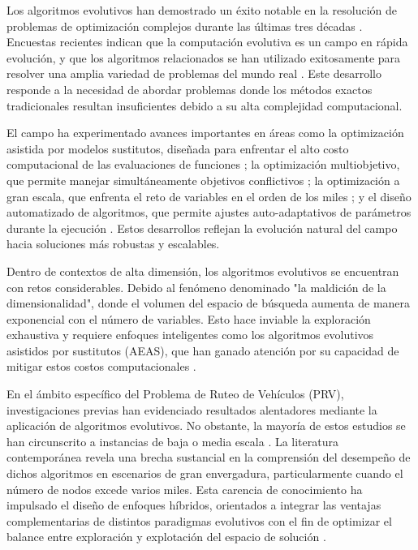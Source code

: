 \documentclass[conference]{IEEEtran}
\begin{document}
Los algoritmos evolutivos han demostrado un éxito notable en la resolución de problemas de optimización complejos durante las últimas tres décadas \cite{fogel2006,back2013}. Encuestas recientes indican que la computación evolutiva es un campo en rápida evolución, y que los algoritmos relacionados se han utilizado exitosamente para resolver una amplia variedad de problemas del mundo real \cite{yang2013}. Este desarrollo responde a la necesidad de abordar problemas donde los métodos exactos tradicionales resultan insuficientes debido a su alta complejidad computacional.

El campo ha experimentado avances importantes en áreas como la optimización asistida por modelos sustitutos, diseñada para enfrentar el alto costo computacional de las evaluaciones de funciones \cite{jin2011}; la optimización multiobjetivo, que permite manejar simultáneamente objetivos conflictivos \cite{coello2007,zhang2008}; la optimización a gran escala, que enfrenta el reto de variables en el orden de los miles \cite{lozano2011}; y el diseño automatizado de algoritmos, que permite ajustes auto-adaptativos de parámetros durante la ejecución \cite{brest2006}. Estos desarrollos reflejan la evolución natural del campo hacia soluciones más robustas y escalables.

Dentro de contextos de alta dimensión, los algoritmos evolutivos se encuentran con retos considerables.
Debido al fenómeno denominado "la maldición de la dimensionalidad", donde el volumen del espacio de búsqueda aumenta de manera exponencial con el número de variables. Esto hace inviable la exploración exhaustiva y requiere enfoques inteligentes como los algoritmos evolutivos asistidos por sustitutos (AEAS), que han ganado atención por su capacidad de mitigar estos costos computacionales \cite{wang2018}.

En el ámbito específico del Problema de Ruteo de Vehículos (PRV), investigaciones previas han evidenciado resultados alentadores mediante la aplicación de algoritmos evolutivos. No obstante, la mayoría de estos estudios se han circunscrito a instancias de baja o media escala \cite{rego2011}. La literatura contemporánea revela una brecha sustancial en la comprensión del desempeño de dichos algoritmos en escenarios de gran envergadura, particularmente cuando el número de nodos excede varios miles. Esta carencia de conocimiento ha impulsado el diseño de enfoques híbridos, orientados a integrar las ventajas complementarias de distintos paradigmas evolutivos con el fin de optimizar el balance entre exploración y explotación del espacio de solución \cite{potter2000}.
\end{document}
